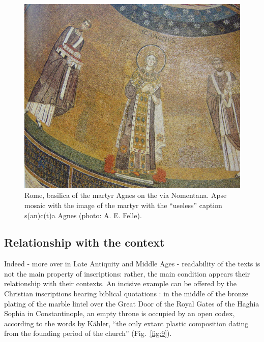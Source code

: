 \documentclass[amsthm,ebook]{saparticle}
\begin{document}
\begin{figure}[!bp]
\centering
 \includegraphics[width=\columnwidth]{FelleVisualFeaturesofinscriptionsEAGLE2016FullPaper-img011.jpg}
\caption{Rome, basilica of the martyr Agnes on the via Nomentana. Apse mosaic with the image of the martyr with the
“useless” caption  s(an)c(t)a Agnes (photo: A. E. Felle).}
\label{fig:8}
\end{figure}













\subsection{Relationship with the context}


\noindent Indeed - more over in Late Antiquity and Middle Ages - readability of the texts is not the main property of
inscriptions: rather, the main condition appears their relationship with their contexts. An incisive example can be
offered by the Christian inscriptions bearing biblical quotations \citep{felle_biblia_2006}: in the middle of the bronze
plating of the marble lintel over the Great Door of the Royal Gates of the Haghia Sophia in Constantinople, an empty
throne is occupied by an open codex, according to the words by Kähler, ``the only extant plastic
composition dating from the founding period of the church'' \citep[29-30; 32][taff. 22; 62]{kahler_hagia_1967}
(Fig.~\ref{fig:9}).
\end{document}
